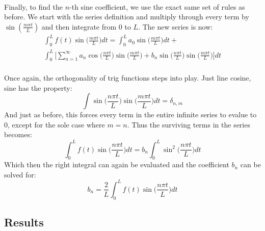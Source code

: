 \documentclass[12pt,letterpaper]{article}
\begin{document}
\paragraph*{}Finally, to find the $n$-th sine coefficient, we use the exact same set of rules as before. We start with the series definition and multiply through every term by $\sin(\frac{m\pi t}{L})$ and then integrate from $0$ to $L$. The new series is now:
\begin{multline}
\label{step3}
\int_0^L f(t)\sin\Big(\frac{m\pi t}{L}\Big) dt = 
\int_0^L a_0\sin\Big(\frac{m\pi t}{L}\Big) dt +  \\
\int_0^L \Bigg[ \sum_{n=1}^{\infty} 
a_n \cos\Big(\frac{n\pi t}{L}\Big)\sin\Big(\frac{m\pi t}{L}\Big) + 
b_n \sin\Big(\frac{n\pi t}{L}\Big)\sin\Big(\frac{m\pi t}{L}\Big) \Bigg] dt
\end{multline}
\paragraph*{}Once again, the orthogonality of trig functions steps into play. Just line cosine, sine has the property:
\begin{equation}
\label{orthog2}
\int \sin\Big(\frac{n\pi t}{L}\Big)\sin\Big(\frac{m\pi t}{L}\Big) dt = \delta_{n,m}
\end{equation}
And just as before, this forces every term in the entire infinite series to evalue to $0$, except for the sole case where $m = n$. Thus the surviving terms in the series becomes:
\begin{equation}
\int_0^L f(t)\sin\Big(\frac{n\pi t}{L}\Big) dt = 
b_n \int_0^L \sin^2\Big(\frac{n\pi t}{L}\Big) dt
\end{equation}
Which then the right integral can again be evaluated and the coefficient $b_n$ can be solved for:
\begin{equation}
\label{b_n}
b_n = \frac{2}{L}\int_0^L f(t) \sin\Big(\frac{n\pi t}{L}\Big) dt
\end{equation}


\subsection{Results}
\end{document}
